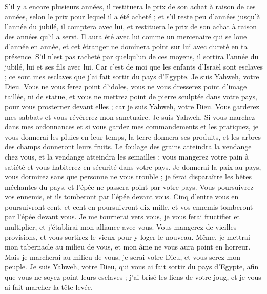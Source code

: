 \begin{multicols}{2}
S'il y a encore plusieurs années, il restituera le prix de son achat à raison de ces années, selon le prix pour lequel il a été acheté ;
et s'il reste peu d'années jusqu'à l'année du jubilé, il comptera avec lui, et restituera le prix de son achat à raison des années qu'il a servi.
Il aura été avec lui comme un mercenaire qui se loue d'année en année, et cet étranger ne dominera point sur lui avec dureté en ta présence.
S'il n'est pas racheté par quelqu'un de ces moyens, il sortira l'année du jubilé, lui et ses fils avec lui.
Car c'est de moi que les enfants d'Israël sont esclaves ; ce sont mes esclaves que j'ai fait sortir du pays d'Egypte. Je suis Yahweh, votre Dieu.
\VerseOne{}Vous ne vous ferez point d'idoles, vous ne vous dresserez point d'image taillée, ni de statue, et vous ne mettrez point de pierre sculptée dans votre pays, pour vous prosterner devant elles ; car je suis Yahweh, votre Dieu.
Vous garderez mes sabbats et vous révérerez mon sanctuaire. Je suis Yahweh.
Si vous marchez dans mes ordonnances et si vous gardez mes commandements et les pratiquez,
je vous donnerai les pluies en leur temps, la terre donnera ses produits, et les arbres des champs donneront leurs fruits.
Le foulage des grains atteindra la vendange chez vous, et la vendange atteindra les semailles ; vous mangerez votre pain à satiété et vous habiterez en sécurité dans votre pays.
Je donnerai la paix au pays, vous dormirez sans que personne ne vous trouble ; je ferai disparaître les bêtes méchantes du pays, et l'épée ne passera point par votre pays.
Vous poursuivrez vos ennemis, et ils tomberont par l'épée devant vous.
Cinq d'entre vous en poursuivront cent, et cent en poursuivront dix mille, et vos ennemis tomberont par l'épée devant vous.
Je me tournerai vers vous, je vous ferai fructifier et multiplier, et j'établirai mon alliance avec vous.
Vous mangerez de vieilles provisions, et vous sortirez le vieux pour y loger le nouveau.
Même, je mettrai mon tabernacle au milieu de vous, et mon âme ne vous aura point en horreur.
Mais je marcherai au milieu de vous, je serai votre Dieu, et vous serez mon peuple.
Je suis Yahweh, votre Dieu, qui vous ai fait sortir du pays d'Egypte, afin que vous ne soyez point leurs esclaves ; j'ai brisé les liens de votre joug, et je vous ai fait marcher la tête levée.

\end{multicols}
